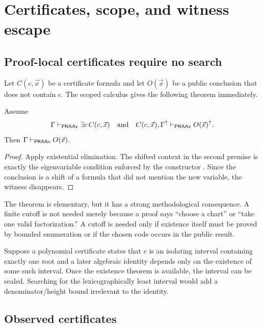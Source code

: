 \section{Certificates, scope, and witness escape}\label{sec:certificates}

\subsection{Proof-local certificates require no search}

Let \(C(c,\vec x)\) be a certificate formula and let \(O(\vec x)\) be a public conclusion that does
not contain \(c\).  The scoped calculus gives the following theorem immediately.

\begin{theorem}\label{thm:seal}
Assume
\[
 \Gamma\vdash_{\mathsf{PRAAx}}\exists c\,C(c,\vec x)
 \quad\text{and}\quad
 C(c,\vec x),\Gamma^{\uparrow}\vdash_{\mathsf{PRAAx}}O(\vec x)^{\uparrow}.
\]
Then \(\Gamma\vdash_{\mathsf{PRAAx}}O(\vec x)\).
\end{theorem}

\begin{proof}
Apply existential elimination.  The shifted context in the second premise is exactly the eigenvariable
condition enforced by the constructor .  Since the conclusion is a shift of a formula
that did not mention the new variable, the witness disappears.
\end{proof}

The theorem is elementary, but it has a strong methodological consequence.  A finite cutoff is not
needed merely because a proof says ``choose a chart'' or ``take one valid factorization.''  A cutoff
is needed only if existence itself must be proved by bounded enumeration or if the chosen code occurs
in the public result.

\begin{example}
Suppose a polynomial certificate states that \(c\) is an isolating interval containing exactly one
root and a later algebraic identity depends only on the existence of some such interval.  Once the
existence theorem is available, the interval can be sealed.  Searching for the lexicographically
least interval would add a denominator/height bound irrelevant to the identity.
\end{example}

\subsection{Observed certificates}

